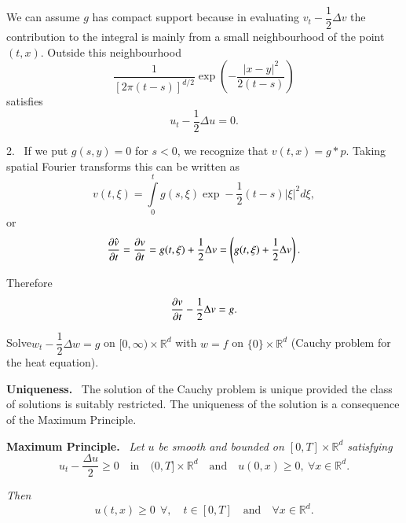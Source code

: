 \begin{remark}\label{chap1-rem1}
We can assume $g$ has compact support because in evaluating
$v_{t}-\dfrac{1}{2}\Delta v$ the contribution to the integral is
mainly from a small neighbourhood of the point $(t,x)$. Outside this
neighbourhood
$$
\frac{1}{[2\pi(t-s)]^{d/2}}\exp \left(-\frac{|x-y|^{2}}{2(t-s)}\right)
$$
satisfies
$$
u_{t}-\frac{1}{2}\Delta u=0.
$$

2.~ If we put $g(s,y)=0$ for $s<0$, we recognize that $v(t,x)=g\ast
p$. Taking spatial Fourier transforms this can be written as
$$
v(t,\xi)=\int\limits^{t}_{0}g(s,\xi)\exp
-\frac{1}{2}(t-s)|\xi|^{2}d\xi,
$$
or
$$
\frac{\partial \hat{v}}{\partial t}=\frac{\partial v}{\partial t}=g(t,\xi)+\frac{1}{2}\Delta
v=\left(g(t,\xi)+\frac{1}{2}\Delta v\right).
$$

Therefore
$$
\frac{\partial v}{\partial t}-\frac{1}{2}\Delta v=g.
$$
\end{remark}

\begin{exercise}\label{chap1-exer4}
Solve\pageoriginale $w_{t}-\dfrac{1}{2}\Delta w=g$ on
$[0,\infty)\times\mathbb{R}^{d}$ with $w=f$ on $\{0\}\times
  \mathbb{R}^{d}$ (Cauchy problem for the heat equation).
\end{exercise}

\smallskip
\noindent
{\bf Uniqueness.}~ The solution of the Cauchy problem is unique
provided the class of solutions is suitably restricted. The uniqueness
of the solution is a consequence of the Maximum Principle.

\medskip
\noindent
{\bf Maximum Principle.}~ {\em Let $u$ be smooth and bounded on
  $[0,T]\times\mathbb{R}^{d}$ satisfying}
$$
u_{t}-\frac{\Delta u}{2}\geq 0\quad\text{in}\quad
(0,T]\times\mathbb{R}^{d}\quad\text{and}\quad u(0,x)\geq 0,\ \forall
x \in \mathbb{R}^{d}. 
$$

{\em Then}
$$
u(t,x)\geq 0 \ \ \forall,\quad t\in [0,T]\quad\text{and}\quad \forall x
\in \mathbb{R}^{d}.
$$

